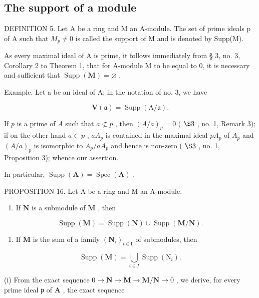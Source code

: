 \subsection{The support of a module}

DEFINITION 5. Let A be a ring and M an A-module. The set of prime ideals p of A such that \(M_{p} \neq 0\) is called the support of M and is denoted by Supp(M).

As every maximal ideal of A is prime, it follows immediately from § 3, no. 3, Corollary 2 to Theorem 1, that for A-module M to be equal to 0, it is necessary and sufficient that \(\operatorname{Supp}(\mathbf{M}) = \varnothing\) .

Example. Let a be an ideal of A; in the notation of no. 3, we have

\[
\mathbf {V} (\mathfrak {a}) = \operatorname{Supp} (\mathrm{A} / \mathfrak {a}).\tag{9}
\]

If \(p\) is a prime of \(A\) such that \(a \not\subset p\) , then \((A/a)_p = 0\) ( \(\S 3\) , no. 1, Remark 3); if on the other hand \(a \subset p\) , \(aA_p\) is contained in the maximal ideal \(pA_p\) of \(A_p\) and \((A/a)_p\) is isomorphic to \(A_p/aA_p\) and hence is non-zero ( \(\S 3\) , no. 1, Proposition 3); whence our assertion.

In particular, \(\operatorname{Supp}(\mathbf{A}) = \operatorname{Spec}(\mathbf{A})\) .

PROPOSITION 16. Let A be a ring and M an A-module.

\begin{enumerate}
\def\labelenumi{(\roman{enumi})}
\tightlist
\item
  If \(\mathbf{N}\) is a submodule of \(\mathbf{M}\) , then
\end{enumerate}

\[
\operatorname{Supp} (\mathbf {M}) = \operatorname{Supp} (\mathbf {N}) \cup \operatorname{Supp} (\mathbf {M} / \mathbf {N}).
\]

\begin{enumerate}
\def\labelenumi{(\roman{enumi})}
\setcounter{enumi}{1}
\tightlist
\item
  If \(\mathbf{M}\) is the sum of a family \((\mathbf{N}_{\iota})_{\iota \in \mathbf{I}}\) of submodules, then
\end{enumerate}

\[
\operatorname{Supp} (\mathbf {M}) = \bigcup_ {i \in I} \operatorname{Supp} \left(\mathrm{N} _ {i}\right).
\]

(i) From the exact sequence \(0 \to \mathbf{N} \to \mathbf{M} \to \mathbf{M} / \mathbf{N} \to 0\) , we derive, for every prime ideal \(\mathfrak{p}\) of \(\mathbf{A}\) , the exact sequence

